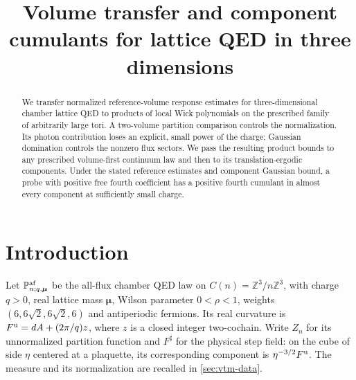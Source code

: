   \RequirePackage[backend=biber,style=alphabetic,backref=true,
    giveninits=true,isbn=false,date=year]{biblatex}
  
  \setcounter{biburlnumpenalty}{100}
  \setcounter{biburllcpenalty}{100}
  \setcounter{biburlucpenalty}{100}
  \renewcommand*{\bibfont}{\footnotesize}
\makeatother
\newcommand{\R}{\mathbb R}
\newcommand{\C}{\mathbb C}
\newcommand{\Z}{\mathbb Z}
\newcommand{\E}{\mathbb E}
\newcommand{\dd}{\mathrm d}
\DeclareMathOperator{\supp}{supp}
\DeclareMathOperator{\tr}{tr}
\allowdisplaybreaks
\title[Volume transfer and component cumulants]{Volume transfer and component cumulants for lattice QED in three dimensions}
\date{}

\begin{abstract}
We transfer normalized reference-volume response estimates for
three-dimensional chamber lattice QED to products of local Wick
polynomials on the prescribed family of arbitrarily large tori.
A two-volume partition comparison controls the normalization.
Its photon contribution loses an explicit, small power of the charge;
Gaussian domination controls the nonzero flux sectors.
We pass the resulting product bounds to any prescribed volume-first
continuum law and then to its translation-ergodic components.
Under the stated reference estimates and component Gaussian bound,
a probe with positive free fourth coefficient has a positive fourth
cumulant in almost every component at sufficiently small charge.
\end{abstract}
\maketitle
\tableofcontents
\section{Introduction}\label{sec:vtm-introduction}

Let $\mathbb P_{n;q,\boldsymbol\mu}^{\rm af}$ be the all-flux
chamber QED law on $C(n)=\Z^3/n\Z^3$, with charge $q>0$,
real lattice mass $\boldsymbol\mu$, Wilson parameter $0<\rho<1$,
weights $(6,6\sqrt2,6\sqrt2,6)$ and antiperiodic fermions.
Its real curvature is $F^{\rm u}=dA+(2\pi/q)z$, where $z$ is
a closed integer two-cochain. Write $Z_n$ for its unnormalized
partition function and $F^\sharp$ for the physical step field:
on the cube of side $\eta$ centered at a plaquette, its
corresponding component is $\eta^{-3/2}F^{\rm u}$.
The measure and its normalization are recalled in
\cref{sec:vtm-data}.

